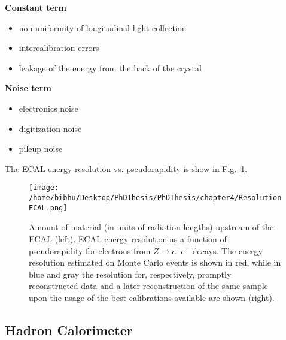 {\bf Constant term}
\vspace{-0.2in}
\begin{itemize}

\item non-uniformity of longitudinal light collection \vspace{-0.2in}

\item intercalibration errors \vspace{-0.2in}

\item leakage of the energy from the back of the crystal \vspace{-0.2in}

\end{itemize} 


{\bf Noise term}
\vspace{-0.2in}

\begin{itemize}

\item electronics noise \vspace{-0.2in}

\item digitization noise \vspace{-0.2in}

\item pileup noise \vspace{-0.2in}
\end{itemize} 

The ECAL energy resolution vs. pseudorapidity is show in Fig.~\ref{fig:ResolutionECAL}.

\begin{figure}[H]
    \centering  
    \texttt{[image: /home/bibhu/Desktop/PhDThesis/PhDThesis/chapter4/ResolutionECAL.png]}
    \caption{ \small Amount of material (in units of radiation lengths) upstream of the ECAL (left). ECAL energy
resolution as a function of pseudorapidity for electrons from $Z\rightarrow e^{+}e^{-}$ decays. The energy resolution
estimated on Monte Carlo events is shown in red, while in blue and gray the resolution for, respectively, promptly reconstructed
data and a later reconstruction of the same sample upon the usage of the best calibrations
available are shown (right).}
    \label{fig:ResolutionECAL}
\end{figure}



\subsection{Hadron Calorimeter}

